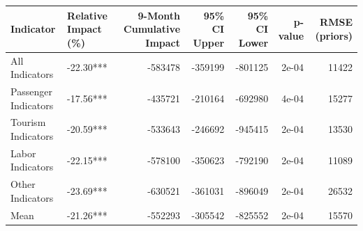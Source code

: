 
\begin{tabular}[t]{l|l|r|r|r|r|r}
\hline
Indicator & Relative Impact (\%) & 9-Month Cumulative Impact & 95\% CI Upper & 95\% CI Lower & p-value & RMSE (priors)\\
\hline
All Indicators & -22.30*** & -583478 & -359199 & -801125 & 2e-04 & 11422\\
\hline
Passenger Indicators & -17.56*** & -435721 & -210164 & -692980 & 4e-04 & 15277\\
\hline
Tourism Indicators & -20.59*** & -533643 & -246692 & -945415 & 2e-04 & 13530\\
\hline
Labor Indicators & -22.15*** & -578100 & -350623 & -792190 & 2e-04 & 11089\\
\hline
Other Indicators & -23.69*** & -630521 & -361031 & -896049 & 2e-04 & 26532\\
\hline
Mean & -21.26*** & -552293 & -305542 & -825552 & 2e-04 & 15570\\
\hline
\end{tabular}
